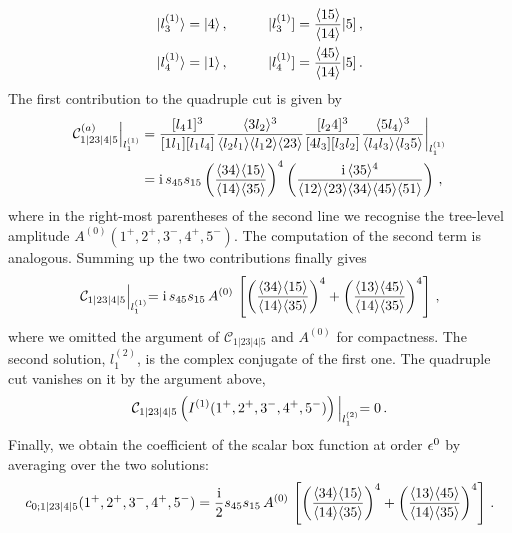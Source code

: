 \begin{enumerate}[a)]
\begin{align}
\begin{alignedat}{2}
 & |l_3^{(1)} \r> = |4\r>  \,, && |l_3^{(1)}] = \frac{\spA15}{\spA14} |5] \,, \\
 & |l_4^{(1)} \r> = |1\r> \,, \qquad \quad && |l_4^{(1)}] = \frac{\spA45}{\spA14} |5] \,.
\end{alignedat}
\end{align}
The first contribution to the quadruple cut is given by
\begin{align} 
\begin{aligned}
\mathcal{C}_{1|23|4|5}^{(a)} \Bigl|_{l_1^{(1)}} & = \frac{[l_4 1]^3}{[1l_1][l_1l_4]} \frac{\langle3 l_2\rangle^3}{\langle l_2 l_1 \rangle \langle l_1 2 \rangle \langle 2 3 \rangle} 
  \frac{[l_2 4]^3}{[4l_3][l_3l_2]} \frac{\langle 5 l_4 \rangle^3}{\langle l_4 l_3 \rangle \langle l_3 5 \rangle}  \biggl|_{l_1^{(1)}} \\
  & = \mathrm{i} \, s_{45} s_{15} \left( \frac{\langle 3 4 \rangle \langle 1 5 \rangle}{\langle 1 4 \rangle \langle 3 5 \rangle} \right)^4 \left(\frac{\mathrm{i} \, \langle 3 5 \rangle^4}{\langle 1 2 \rangle \langle 2 3 \rangle \langle 3 4 \rangle \langle 4 5 \rangle \langle 5 1 \rangle} \right) \,,
\end{aligned}
\end{align}
where in the right-most parentheses of the second line we recognise the tree-level amplitude $A^{(0)}(1^+,2^+,3^-,4^+,5^-)$. The computation of the second term is analogous. Summing up the two contributions finally gives
\begin{align}
\mathcal{C}_{1|23|4|5} \Bigl|_{l_1^{(1)}} =  \mathrm{i} \, s_{45} s_{15} \, A^{(0)} \, 
  \left[ \left( \frac{\langle 3 4 \rangle \langle 1 5 \rangle}{\langle 1 4 \rangle \langle 3 5 \rangle} \right)^4 + \left( \frac{\langle 1 3 \rangle \langle 4 5 \rangle}{\langle 1 4 \rangle \langle 3 5 \rangle} \right)^4 \right]  \,,
\end{align}
where we omitted the argument of $\mathcal{C}_{1|23|4|5}$ and $A^{(0)}$ for compactness.
The second solution, $l_1^{(2)}$, is the complex conjugate of the first one. The quadruple cut vanishes on it by the argument above,
\begin{align}
\mathcal{C}_{1|23|4|5} \left(I^{(1)}(1^+,2^+,3^-,4^+,5^-)\right) \Bigl|_{l_1^{(2)}} =  0\,.
\end{align}
Finally, we obtain the coefficient of the scalar box function at order $\epsilon^0$ by averaging over the two solutions:
\begin{align}
c_{0;1|23|4|5}(1^+,2^+,3^-,4^+,5^-) =  \frac{\mathrm{i}}{2} s_{45} s_{15} \, A^{(0)} \, 
  \left[ \left( \frac{\langle 3 4 \rangle \langle 1 5 \rangle}{\langle 1 4 \rangle \langle 3 5 \rangle} \right)^4 + \left( \frac{\langle 1 3 \rangle \langle 4 5 \rangle}{\langle 1 4 \rangle \langle 3 5 \rangle} \right)^4 \right]  \,.
\end{align}


\end{enumerate}



